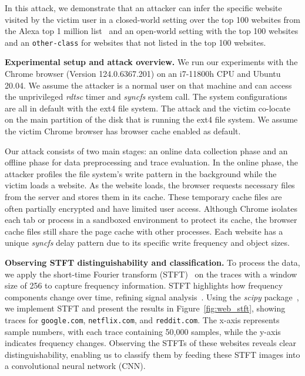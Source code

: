 In this attack, we demonstrate that an attacker can infer the specific website visited by the victim user in a closed-world setting over the top 100 websites from the Alexa top 1 million list~\cite{alexa_100} and an open-world setting with the top 100 websites and an \texttt{other-class} for websites that not listed in the top 100 websites. 

\textbf{{Experimental setup and attack overview.}} We run our experiments with the Chrome browser (Version 124.0.6367.201) on an i7-11800h CPU and Ubuntu 20.04. We assume the attacker is a normal user on that machine and can access the unprivileged \textit{rdtsc} timer and \textit{syncfs} system call. The system configurations are all in default with the ext4 file system. The attack and the victim co-locate on the main partition of the disk that is running the ext4 file system. We assume the victim Chrome browser has browser cache enabled as default. 

Our attack consists of two main stages: an online data collection phase and an offline phase for data preprocessing and trace evaluation. In the online phase, the attacker profiles the file system's write pattern in the background while the victim loads a website. As the website loads, the browser requests necessary files from the server and stores them in its cache. These temporary cache files are often partially encrypted and have limited user access. Although Chrome isolates each tab or process in a sandboxed environment to protect its cache, the browser cache files still share the page cache with other processes. Each website has a unique \textit{syncfs} delay pattern due to its specific write frequency and object sizes. 



\textbf{Observing STFT distinguishability and classification.}
To process the data, we apply the short-time Fourier transform (STFT)~\cite{griffin1984signal} on the traces with a window size of 256 to capture frequency information. STFT highlights how frequency components change over time, refining signal analysis~\cite{rauscher2024idleleak, huang2019ecg_stft, chikkerur2007fingerprint_stft}. Using the \textit{scipy} package~\cite{virtanen2020scipy}, we implement STFT and present the results in Figure~\ref{fig:web_stft}, showing traces for \texttt{google.com}, \texttt{netflix.com}, and \texttt{reddit.com}. The x-axis represents sample numbers, with each trace containing 50,000 samples, while the y-axis indicates frequency changes. Observing the STFTs of these websites reveals clear distinguishability, enabling us to classify them by feeding these STFT images into a convolutional neural network (CNN).

